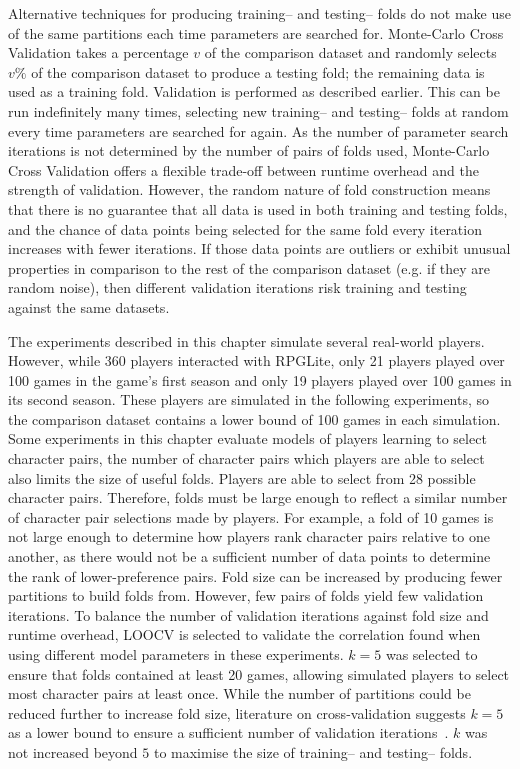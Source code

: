 Alternative techniques for producing training-- and testing-- folds do not make
use of the same partitions each time parameters are searched for. Monte-Carlo
Cross Validation takes a percentage $v$ of the comparison dataset and randomly
selects $v\%$ of the comparison dataset to produce a testing fold; the remaining
data is used as a training fold. Validation is performed as described earlier.
This can be run indefinitely many times, selecting new training-- and testing--
folds at random every time parameters are searched for again. As the number of
parameter search iterations is not determined by the number of pairs of folds
used, Monte-Carlo Cross Validation offers a flexible trade-off between runtime
overhead and the strength of validation. However, the random nature of fold
construction means that there is no guarantee that all data is used in both
training and testing folds, and the chance of data points being selected for the
same fold every iteration increases with fewer iterations. If those data points
are outliers or exhibit unusual properties in comparison to the rest of the
comparison dataset (e.g. if they are random noise), then different validation
iterations risk training and testing against the same datasets.

The experiments described in this chapter simulate several real-world players.
However, while 360 players interacted with RPGLite, only 21 players played over
100 games in the game's first season and only 19 players played over 100 games
in its second season. These players are simulated in the following experiments,
so the comparison dataset contains a lower bound of 100 games in each
simulation. Some experiments in this chapter evaluate models of players learning
to select character pairs, the number of character pairs which players are able
to select also limits the size of useful folds. Players are able to select from
28 possible character pairs. Therefore, folds must be large enough to reflect a
similar number of character pair selections made by players. For example, a fold
of 10 games is not large enough to determine how players rank character pairs
relative to one another, as there would not be a sufficient number of data
points to determine the rank of lower-preference pairs. Fold size can be
increased by producing fewer partitions to build folds from. However, few pairs
of folds yield few validation iterations. To balance the number of validation
iterations against fold size and runtime overhead, LOOCV is selected to validate
the correlation found when using different model parameters in these
experiments. $k=5$ was selected to ensure that folds contained at least 20
games, allowing simulated players to select most character pairs at least once.
While the number of partitions could be reduced further to increase fold size,
literature on cross-validation suggests $k=5$ as a lower bound to ensure a
sufficient number of validation iterations~\cite{hastie2009elements}. $k$ was
not increased beyond $5$ to maximise the size of training-- and testing-- folds.

